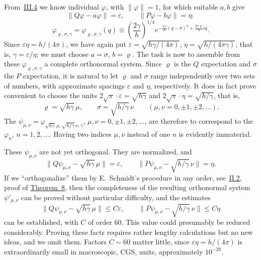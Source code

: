 \documentclass[fontsize=13pt,twoside,openany,headings=normal,parskip=false,bookmarkpackage=false,DIV=calc]{scrbook}
\begin{document}
From~\hyperref[sec:III.4]{III.4} we know individual $\varphi$, with $\|\varphi\|=1$, for which suitable $a,b$ give
\[
\|Q\varphi-a\varphi\|=\varepsilon,\qquad\|P\varphi-b\varphi\|=\eta:
\]
\[
\varphi_{\varrho,\sigma,\gamma}
=\varphi_{\varrho,\sigma,\gamma}(q)
\equiv\left(\frac{2\gamma}{h}\right)^{1/4}
 e^{-\frac{\pi\gamma}{h}(q-\sigma)^2+\frac{2\pi\varrho}{h}iq}.
\]
Since $\varepsilon\eta=h/(4\pi)$, we have again put $\varepsilon=\sqrt{h\gamma/(4\pi)}$, $\eta=\sqrt{h/(4\pi\gamma)}$, that is, $\gamma=\varepsilon/\eta$; we must choose $a=\sigma$, $b=\varrho$. The task is now to assemble from these $\varphi_{\varrho,\sigma,\gamma}$ a complete orthonormal system.
\hypertarget{origpage-217}{}%
Since $\varrho$ is the $Q$ expectation and $\sigma$ the $P$ expectation, it is natural to let $\varrho$ and $\sigma$ range independently over two sets of numbers, with approximate spacings $\varepsilon$ and $\eta$, respectively. It does in fact prove convenient to choose the units $2\sqrt\pi\cdot\varepsilon=\sqrt{h\gamma}$ and $2\sqrt\pi\cdot\eta=\sqrt{h/\gamma}$, that is,
\[
\varrho=\sqrt{h\gamma}\,\mu,\qquad\sigma=\sqrt{h/\gamma}\,\nu
\qquad(\mu,\nu=0,\pm1,\pm2,\ldots).
\]
The $\psi_{\mu,\nu}=\varphi_{\sqrt{h\gamma}\,\mu,\sqrt{h/\gamma}\,\nu,\gamma}$, $\mu,\nu=0,\pm1,\pm2,\ldots$, are therefore to correspond to the $\varphi_n$, $n=1,2,\ldots$. Having two indices $\mu,\nu$ instead of one $n$ is evidently immaterial.

These $\psi_{\mu,\nu}$ are not yet orthogonal. They are normalized, and
\[
\|Q\psi_{\mu,\nu}-\sqrt{h\gamma}\,\mu\|=\varepsilon,\qquad
\|P\psi_{\mu,\nu}-\sqrt{h/\gamma}\,\nu\|=\eta.
\]
If we ``orthogonalize'' them by E.~Schmidt's procedure in any order, see~\hyperref[sec:II.2]{II.2}, proof of \hyperref[thm:II.8]{Theorem~8}, then the completeness of the resulting orthonormal system $\psi'_{\mu,\nu}$ can be proved without particular difficulty, and the estimates
\[
\|Q\psi_{\mu,\nu}-\sqrt{h\gamma}\,\mu\|\leq C\varepsilon,\qquad
\|P\psi_{\mu,\nu}-\sqrt{h/\gamma}\,\nu\|\leq C\eta
\]
can be established, with $C$ of order $60$. This value could presumably be reduced considerably. Proving these facts requires rather lengthy calculations but no new ideas, and we omit them. Factors $C\sim60$ matter little, since $\varepsilon\eta=h/(4\pi)$ is extraordinarily small in macroscopic, CGS, units, approximately $10^{-28}$.
\end{document}
